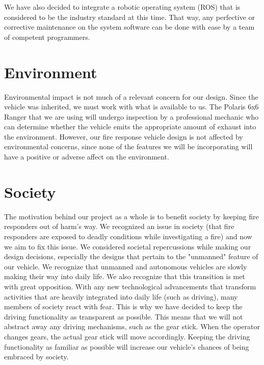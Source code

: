 We have also decided to integrate a robotic operating system (ROS) that is considered to be the industry standard at this time. That way, any perfective or corrective maintenance on the system software can be done with ease by a team of competent programmers. 

\section{Environment} Environmental impact is not much of a relevant concern for our design. Since the vehicle was inherited, we must work with what is available to us. The Polaris 6x6 Ranger that we are using will undergo inspection by a professional mechanic who can determine whether the vehicle emits the appropriate amount of exhaust into the environment. However, our fire response vehicle design is not affected by environmental concerns, since none of the features we will be incorporating will have a positive or adverse affect on the environment. 

\section{Society} The motivation behind our project as a whole is to benefit society by keeping fire responders out of harm's way. We recognized an issue in society (that fire responders are exposed to deadly conditions while investigating a fire) and now we aim to fix this issue. We considered societal repercussions while making our design decisions, especially the designs that pertain to the "unmanned" feature of our vehicle. We recognize that unmanned and autonomous vehicles are slowly making their way into daily life. \cite{autonomouscars} We also recognize that this transition is met with great opposition. With any new technological advancements that transform activities that are heavily integrated into daily life (such as driving), many members of society react with fear. This is why we have decided to keep the driving functionality as transparent as possible. This means that we will not abstract away any driving mechanisms, such as the gear stick. When the operator changes gears, the actual gear stick will move accordingly. Keeping the driving functionality as familiar as possible will increase our vehicle's chances of being embraced by society. 



